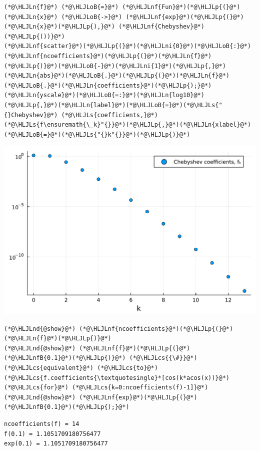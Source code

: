\documentclass[12pt,a4paper]{article}
\newcommand{\HLJLn}[1]{#1}
\newcommand{\HLJLnd}[1]{\textcolor[RGB]{214,102,97}{#1}}
\newcommand{\HLJLnf}[1]{\textcolor[RGB]{66,102,213}{#1}}
\newcommand{\HLJLs}[1]{\textcolor[RGB]{201,61,57}{#1}}
\newcommand{\HLJLnfB}[1]{\textcolor[RGB]{59,151,46}{#1}}
\newcommand{\HLJLni}[1]{\textcolor[RGB]{59,151,46}{#1}}
\newcommand{\HLJLoB}[1]{\textcolor[RGB]{102,102,102}{\textbf{#1}}}
\newcommand{\HLJLp}[1]{#1}
\newcommand{\HLJLcs}[1]{\textcolor[RGB]{153,153,119}{\textit{#1}}}
\begin{document}
\begin{lstlisting}
(*@\HLJLn{f}@*) (*@\HLJLoB{=}@*) (*@\HLJLnf{Fun}@*)(*@\HLJLp{(}@*)(*@\HLJLn{x}@*) (*@\HLJLoB{->}@*) (*@\HLJLnf{exp}@*)(*@\HLJLp{(}@*)(*@\HLJLn{x}@*)(*@\HLJLp{),}@*) (*@\HLJLnf{Chebyshev}@*)(*@\HLJLp{())}@*)
(*@\HLJLnf{scatter}@*)(*@\HLJLp{(}@*)(*@\HLJLni{0}@*)(*@\HLJLoB{:}@*)(*@\HLJLnf{ncoefficients}@*)(*@\HLJLp{(}@*)(*@\HLJLn{f}@*)(*@\HLJLp{)}@*)(*@\HLJLoB{-}@*)(*@\HLJLni{1}@*)(*@\HLJLp{,}@*)(*@\HLJLn{abs}@*)(*@\HLJLoB{.}@*)(*@\HLJLp{(}@*)(*@\HLJLn{f}@*)(*@\HLJLoB{.}@*)(*@\HLJLn{coefficients}@*)(*@\HLJLp{);}@*)(*@\HLJLn{yscale}@*)(*@\HLJLoB{=:}@*)(*@\HLJLn{log10}@*)(*@\HLJLp{,}@*)(*@\HLJLn{label}@*)(*@\HLJLoB{=}@*)(*@\HLJLs{"{}Chebyshev}@*) (*@\HLJLs{coefficients,}@*) (*@\HLJLs{f\ensuremath{\_k}"{}}@*)(*@\HLJLp{,}@*)(*@\HLJLn{xlabel}@*)(*@\HLJLoB{=}@*)(*@\HLJLs{"{}k"{}}@*)(*@\HLJLp{)}@*)
\end{lstlisting}

\includegraphics[width=\linewidth]{jl_hpkPoK/OP_methods_test_22_1.pdf}

\begin{lstlisting}
(*@\HLJLnd{@show}@*) (*@\HLJLnf{ncoefficients}@*)(*@\HLJLp{(}@*)(*@\HLJLn{f}@*)(*@\HLJLp{)}@*)
(*@\HLJLnd{@show}@*) (*@\HLJLnf{f}@*)(*@\HLJLp{(}@*)(*@\HLJLnfB{0.1}@*)(*@\HLJLp{)}@*) (*@\HLJLcs{{\#}}@*) (*@\HLJLcs{equivalent}@*) (*@\HLJLcs{to}@*) (*@\HLJLcs{f.coefficients{\textquotesingle}*[cos(k*acos(x))}@*) (*@\HLJLcs{for}@*) (*@\HLJLcs{k=0:ncoefficients(f)-1]}@*)
(*@\HLJLnd{@show}@*) (*@\HLJLnf{exp}@*)(*@\HLJLp{(}@*)(*@\HLJLnfB{0.1}@*)(*@\HLJLp{);}@*)
\end{lstlisting}

\begin{lstlisting}
ncoefficients(f) = 14
f(0.1) = 1.1051709180756477
exp(0.1) = 1.1051709180756477
\end{lstlisting}
\end{document}
